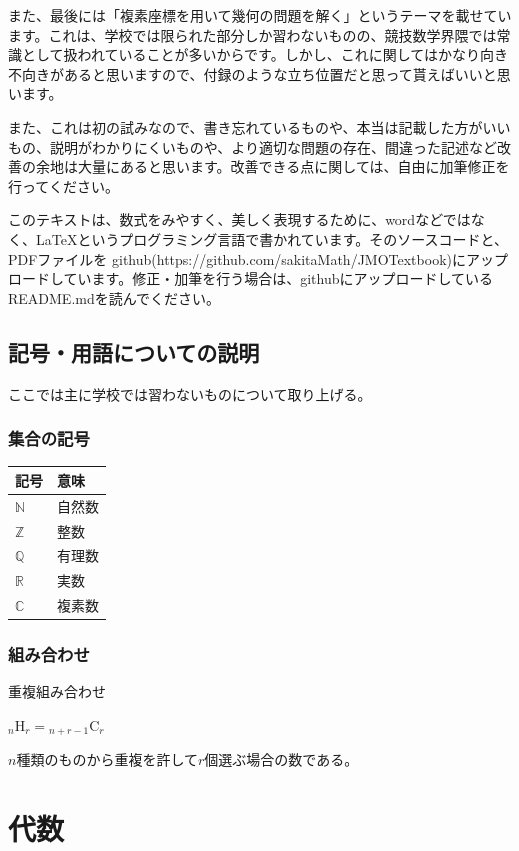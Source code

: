 \documentclass[uplatex,dvipdfmx]{jsbook}
\begin{document}
また、最後には「複素座標を用いて幾何の問題を解く」というテーマを載せています。これは、学校では限られた部分しか習わないものの、競技数学界隈では常識として扱われていることが多いからです。しかし、これに関してはかなり向き不向きがあると思いますので、付録のような立ち位置だと思って貰えばいいと思います。

また、これは初の試みなので、書き忘れているものや、本当は記載した方がいいもの、説明がわかりにくいものや、より適切な問題の存在、間違った記述など改善の余地は大量にあると思います。改善できる点に関しては、自由に加筆修正を行ってください。

このテキストは、数式をみやすく、美しく表現するために、wordなどではなく、\LaTeX というプログラミング言語で書かれています。そのソースコードと、PDFファイルを
github(https://github.com/sakitaMath/JMOTextbook)にアップロードしています。修正・加筆を行う場合は、githubにアップロードしているREADME.mdを読んでください。

\section{記号・用語についての説明}
ここでは主に学校では習わないものについて取り上げる。
\subsection{集合の記号}
\begin{table}[h]
    \begin{tabular}{l|l}
        記号 & 意味\\\hline\hline
        $\mathbb{N}$ & 自然数\\
        $\mathbb{Z}$ & 整数\\
        $\mathbb{Q}$ & 有理数\\
        $\mathbb{R}$ & 実数\\
        $\mathbb{C}$ & 複素数\\\hline
    \end{tabular}
\end{table}

\subsection{組み合わせ}

重複組み合わせ

${}_n \mathrm{ H }_r = {}_{n+r-1} \mathrm{ C }_r$

$n$種類のものから重複を許して$r$個選ぶ場合の数である。

\chapter{代数}
\end{document}
